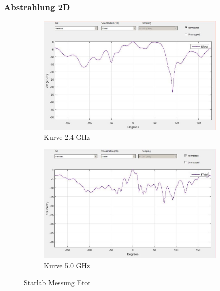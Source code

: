 \subsubsection{Abstrahlung 2D}
\begin{figure}[h!]
	\begin{center}
		\begin{subfigure}[t]{0.49\textwidth}
			\begin{center}
				\includegraphics[width=1\textwidth]{../fig/plt/2_4GHz_E_tot_curve.jpg}
				\caption{Kurve 2.4 GHz}
				\label{fig:curve_2ghz4}
			\end{center}
		\end{subfigure}
		\begin{subfigure}[t]{0.49\textwidth}
			\begin{center}
				\includegraphics[width=1\textwidth]{../fig/plt/5GHz_E_tot_curve.jpg}
				\caption{Kurve 5.0 GHz}
				\label{fig:curve_5ghz0}
			\end{center}
		\end{subfigure}
		\caption{Starlab Messung Etot}
		\label{fig:starlab_etot_curve}
	\end{center}
\end{figure}

